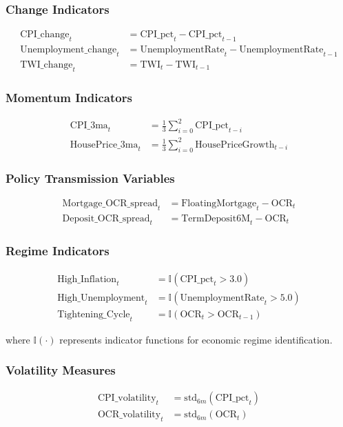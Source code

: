 \documentclass[11pt,a4paper]{article}
\begin{document}
	\subsubsection{Change Indicators}
	\begin{align}
		\text{CPI\_change}_t &= \text{CPI\_pct}_t - \text{CPI\_pct}_{t-1} \\
		\text{Unemployment\_change}_t &= \text{UnemploymentRate}_t - \text{UnemploymentRate}_{t-1} \\
		\text{TWI\_change}_t &= \text{TWI}_t - \text{TWI}_{t-1}
	\end{align}
	
	\subsubsection{Momentum Indicators}
	\begin{align}
		\text{CPI\_3ma}_t &= \frac{1}{3}\sum_{i=0}^{2} \text{CPI\_pct}_{t-i} \\
		\text{HousePrice\_3ma}_t &= \frac{1}{3}\sum_{i=0}^{2} \text{HousePriceGrowth}_{t-i}
	\end{align}
	
	\subsubsection{Policy Transmission Variables}
	\begin{align}
		\text{Mortgage\_OCR\_spread}_t &= \text{FloatingMortgage}_t - \text{OCR}_t \\
		\text{Deposit\_OCR\_spread}_t &= \text{TermDeposit6M}_t - \text{OCR}_t
	\end{align}
	
	\subsubsection{Regime Indicators}
	\begin{align}
		\text{High\_Inflation}_t &= \mathbb{I}(\text{CPI\_pct}_t > 3.0) \\
		\text{High\_Unemployment}_t &= \mathbb{I}(\text{UnemploymentRate}_t > 5.0) \\
		\text{Tightening\_Cycle}_t &= \mathbb{I}(\text{OCR}_t > \text{OCR}_{t-1})
	\end{align}
	
	where $\mathbb{I}(\cdot)$ represents indicator functions for economic regime identification.
	
	\subsubsection{Volatility Measures}
	\begin{align}
		\text{CPI\_volatility}_t &= \text{std}_{6m}(\text{CPI\_pct}_t) \\
		\text{OCR\_volatility}_t &= \text{std}_{6m}(\text{OCR}_t)
	\end{align}
	
\end{document}
